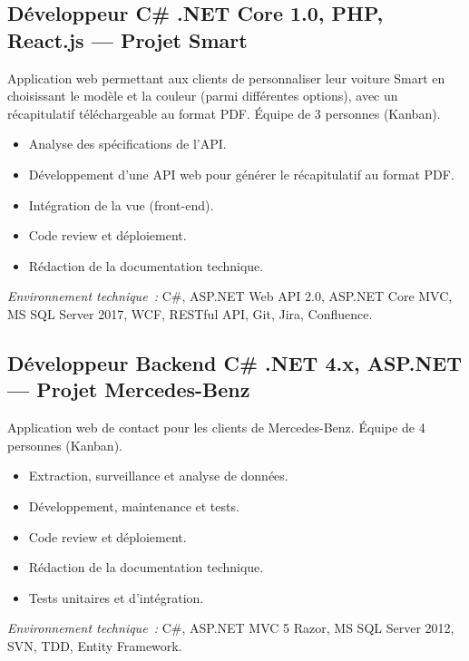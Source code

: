 \documentclass[10pt,a4paper]{article}
\begin{document}
\subsection*{Développeur C\# .NET Core 1.0, PHP, React.js --- Projet Smart}
\color{darkgray}
Application web permettant aux clients de personnaliser leur voiture Smart en choisissant le modèle et la couleur (parmi différentes options), avec un récapitulatif téléchargeable au format PDF. Équipe de 3 personnes (Kanban).
\begin{itemize}
  \item Analyse des spécifications de l'API.
  \item Développement d'une API web pour générer le récapitulatif au format PDF.
  \item Intégration de la vue (front-end).
  \item Code review et déploiement.
  \item Rédaction de la documentation technique.
\end{itemize}
\textit{Environnement technique~:} C\#, ASP.NET Web API 2.0, ASP.NET Core MVC, MS SQL Server 2017, WCF, RESTful API, Git, Jira, Confluence.

\vspace{6pt}

\subsection*{Développeur Backend C\# .NET 4.x, ASP.NET --- Projet Mercedes-Benz}
\color{darkgray}
Application web de contact pour les clients de Mercedes-Benz. Équipe de 4 personnes (Kanban).
\begin{itemize}
  \item Extraction, surveillance et analyse de données.
  \item Développement, maintenance et tests.
  \item Code review et déploiement.
  \item Rédaction de la documentation technique.
  \item Tests unitaires et d'intégration.
\end{itemize}
\textit{Environnement technique~:} C\#, ASP.NET MVC 5 Razor, MS SQL Server 2012, SVN, TDD, Entity Framework.

\vspace{6pt}
\end{document}
